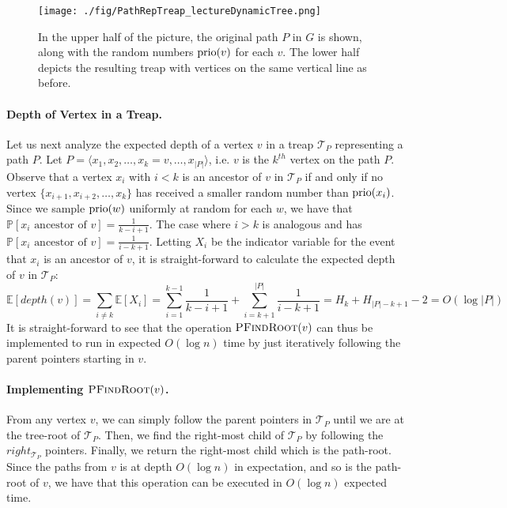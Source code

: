 \begin{figure}[!ht]
    \centering
    \texttt{[image: ./fig/PathRepTreap\_lectureDynamicTree.png]}
    \caption{In the upper half of the picture, the original path $P$ in $G$ is shown, along with the random numbers $\operatorname{prio}(v)$ for each $v$. The lower half depicts the resulting treap with vertices on the same vertical line as before.}
    \label{fig:PathAsTreap}
\end{figure}

\paragraph{Depth of Vertex in a Treap.} Let us next analyze the expected depth of a vertex $v$ in a treap $\mathcal{T}_{P}$ representing a path $P$. Let $P = \langle x_1, x_2, \dots, x_k = v, \dots, x_{|P|}\rangle$, i.e. $v$ is the $k^{th}$ vertex on the path $P$. Observe that a vertex $x_i$ with $i < k$ is an ancestor of $v$ in $\mathcal{T}_{P}$ if and only if no vertex $\{x_{i+1}, x_{i+2}, \dots, x_k\}$ has received a smaller random number than $\operatorname{prio}(x_i)$. Since we sample $\operatorname{prio}(w)$ uniformly at random for each $w$, we have that $\mathbb{P}[x_i \text{ ancestor of } v] = \frac{1}{k-i+1}$. The case where $i > k$ is analogous and has $\mathbb{P}[x_i \text{ ancestor of } v] = \frac{1}{i-k+1}$. Letting $X_i$ be the indicator variable for the event that $x_i$ is an ancestor of $v$, it is straight-forward to calculate the expected depth of $v$ in $\mathcal{T}_{P}$:
\[
    \mathbb{E}[depth(v)] = \sum_{i \neq k} \mathbb{E}[X_i] =  \sum_{i = 1}^{k-1}\frac{1}{k-i+1} + \sum_{i = k+1}^{|P|} \frac{1}{i-k+1} = H_k + H_{|P|-k+1} - 2 = O(\log |P|)
\]
It is straight-forward to see that the operation $\textsc{PFindRoot}(v)$ can thus be implemented to run in expected $O(\log n)$ time by just iteratively following the parent pointers starting in $v$.

\paragraph{Implementing $\textsc{PFindRoot}(v)$.} From any vertex $v$, we can simply follow the parent pointers in $\mathcal{T}_{P}$ until we are at the tree-root of $\mathcal{T}_{P}$. Then, we find the right-most child of $\mathcal{T}_{P}$ by following the $right_{\mathcal{T}_{P}}$ pointers. Finally, we return the right-most child which is the path-root. Since the paths from $v$ is at depth $O(\log n)$ in expectation, and so is the path-root of $v$, we have that this operation can be executed in $O(\log n)$ expected time.

